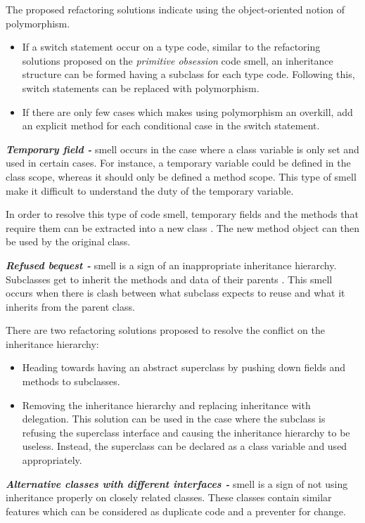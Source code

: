 The proposed refactoring solutions \cite{fowlerRefactor} indicate using the object-oriented notion of polymorphism.

\begin{itemize}
\item If a switch statement occur on a type code, similar to the refactoring solutions proposed on the \textit{primitive obsession} code smell, an inheritance structure can be formed having a subclass for each type code. Following this, switch statements can be replaced with polymorphism.
\item If there are only few cases which makes using polymorphism an overkill, add an explicit method for each conditional case in the switch statement.
\end{itemize}

\textit{\textbf{Temporary field -}} smell occurs in the case where a class variable is only set and used in certain cases. For instance, a temporary variable could be defined in the class scope, whereas it should only be defined a method scope. This type of smell make it difficult to understand the duty of the temporary variable. 

In order to resolve this type of code smell, temporary fields and the methods that require them can be extracted into a new class \cite{fowlerRefactor}. The new method object can then be used by the original class. 

\textit{\textbf{Refused bequest -}} smell is a sign of an inappropriate inheritance hierarchy. Subclasses get to inherit the methods and data of their parents \cite{fowlerRefactor}. This smell occurs when there is clash between what subclass expects to reuse and what it inherits from the parent class.

There are two refactoring solutions proposed to resolve the conflict on the inheritance hierarchy:

\begin{itemize}
\item Heading towards having an abstract superclass by pushing down fields and methods to subclasses.
\item Removing the inheritance hierarchy and replacing inheritance with delegation. This solution can be used in the case where the subclass is refusing the superclass interface and causing the inheritance hierarchy to be useless. Instead, the superclass can be declared as a class variable and used appropriately. 
\end{itemize}

\textit{\textbf{Alternative classes with different interfaces -}} smell is a sign of not using inheritance properly on closely related classes. These classes contain similar features which can be considered as duplicate code and a preventer for change.

